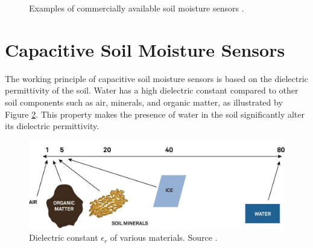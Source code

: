 \begin{figure}
    \hfil
    \caption{\label{fig:satellite}Examples of commercially available soil moisture sensors \cite{meter_group_teros_nodate, baseline_soil_2021, czechproject_spol_sro_pudni_2024}.}
\end{figure}

\section{\label{section:soil-moisure-sensors-theory}Capacitive Soil Moisture Sensors}
The working principle of capacitive soil moisture sensors is based on the dielectric permittivity of the soil. Water has a high dielectric constant compared to other soil components such as air, minerals, and organic matter, as illustrated by Figure \ref{fig:dielectric-constant}. This property makes the presence of water in the soil significantly alter its dielectric permittivity.

\begin{figure}
    \includegraphics[width=.7\textwidth]{fig/dielectric-constant.jpg}
    \caption{\label{fig:dielectric-constant}Dielectric constant $\epsilon_r$ of various materials. Source \cite{meter_group_soil_2023}.}
\end{figure}

